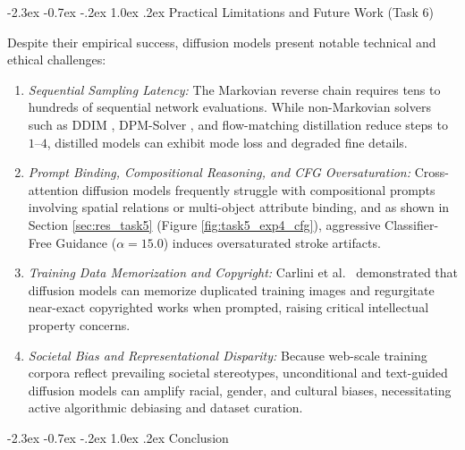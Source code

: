 \documentclass[10pt,a4paper]{article}
\makeatletter
\renewcommand\section{\@startsection {section}{1}{\z@}%
                                   {-2.3ex \@plus -0.7ex \@minus -.2ex}%
                                   {1.0ex \@plus.2ex}%
                                   {\normalfont\large\bfseries}}
\makeatother
\begin{document}
\section{Practical Limitations and Future Work (Task 6)}
\label{sec:limitations}

Despite their empirical success, diffusion models present notable technical and ethical challenges:
\begin{enumerate}[leftmargin=1.8em, itemsep=0.12em, topsep=0.2em]
    \item \textit{Sequential Sampling Latency:} The Markovian reverse chain requires tens to hundreds of sequential network evaluations. While non-Markovian solvers such as DDIM \cite{song2021denoising}, DPM-Solver \cite{lu2022dpm}, and flow-matching distillation \cite{lipman2023flow, salimans2022progressive} reduce steps to $1$--$4$, distilled models can exhibit mode loss and degraded fine details.
    \item \textit{Prompt Binding, Compositional Reasoning, and CFG Oversaturation:} Cross-attention diffusion models frequently struggle with compositional prompts involving spatial relations or multi-object attribute binding, and as shown in Section \ref{sec:res_task5} (Figure \ref{fig:task5_exp4_cfg}), aggressive Classifier-Free Guidance ($\alpha = 15.0$) induces oversaturated stroke artifacts.
    \item \textit{Training Data Memorization and Copyright:} Carlini et al.\ \cite{carlini2023extracting} demonstrated that diffusion models can memorize duplicated training images and regurgitate near-exact copyrighted works when prompted, raising critical intellectual property concerns.
    \item \textit{Societal Bias and Representational Disparity:} Because web-scale training corpora reflect prevailing societal stereotypes, unconditional and text-guided diffusion models can amplify racial, gender, and cultural biases, necessitating active algorithmic debiasing and dataset curation.
\end{enumerate}

\section{Conclusion}
\label{sec:conclusion}
\end{document}
